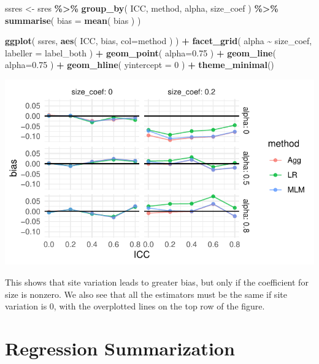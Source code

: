 \documentclass[
]{book}
\newenvironment{Shaded}{\begin{snugshade}}{\end{snugshade}}
\newcommand{\AttributeTok}[1]{\textcolor[rgb]{0.13,0.29,0.53}{#1}}
\newcommand{\DecValTok}[1]{\textcolor[rgb]{0.00,0.00,0.81}{#1}}
\newcommand{\FloatTok}[1]{\textcolor[rgb]{0.00,0.00,0.81}{#1}}
\newcommand{\FunctionTok}[1]{\textcolor[rgb]{0.13,0.29,0.53}{\textbf{#1}}}
\newcommand{\NormalTok}[1]{#1}
\newcommand{\OtherTok}[1]{\textcolor[rgb]{0.56,0.35,0.01}{#1}}
\newcommand{\SpecialCharTok}[1]{\textcolor[rgb]{0.81,0.36,0.00}{\textbf{#1}}}
\begin{document}
\begin{Shaded}
\begin{Highlighting}[]
\NormalTok{ssres }\OtherTok{\textless{}{-}} 
\NormalTok{  sres }\SpecialCharTok{\%\textgreater{}\%} 
  \FunctionTok{group\_by}\NormalTok{( ICC, method, alpha, size\_coef ) }\SpecialCharTok{\%\textgreater{}\%}
  \FunctionTok{summarise}\NormalTok{( }\AttributeTok{bias =} \FunctionTok{mean}\NormalTok{( bias ) )}

\FunctionTok{ggplot}\NormalTok{( ssres, }\FunctionTok{aes}\NormalTok{( ICC, bias, }\AttributeTok{col=}\NormalTok{method ) ) }\SpecialCharTok{+}
  \FunctionTok{facet\_grid}\NormalTok{( alpha }\SpecialCharTok{\textasciitilde{}}\NormalTok{  size\_coef, }\AttributeTok{labeller =}\NormalTok{ label\_both ) }\SpecialCharTok{+}
  \FunctionTok{geom\_point}\NormalTok{( }\AttributeTok{alpha=}\FloatTok{0.75}\NormalTok{ ) }\SpecialCharTok{+} 
  \FunctionTok{geom\_line}\NormalTok{( }\AttributeTok{alpha=}\FloatTok{0.75}\NormalTok{ ) }\SpecialCharTok{+}
  \FunctionTok{geom\_hline}\NormalTok{( }\AttributeTok{yintercept =} \DecValTok{0}\NormalTok{ ) }\SpecialCharTok{+}
  \FunctionTok{theme\_minimal}\NormalTok{()}
\end{Highlighting}
\end{Shaded}

\begin{center}\includegraphics[width=0.75\linewidth]{Designing-Simulations-in-R_files/figure-latex/unnamed-chunk-154-1} \end{center}

This shows that site variation leads to greater bias, but only if the coefficient for size is nonzero.
We also see that all the estimators must be the same if site variation is 0, with the overplotted lines on the top row of the figure.

\section{Regression Summarization}\label{regression-summarization}
\end{document}
